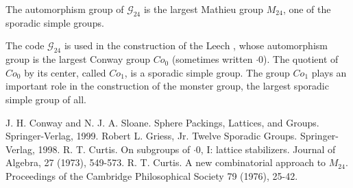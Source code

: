 \documentclass[12pt]{article}
\newcommand{\gc}{\mathcal{G}_{24}}
\begin{document}
The automorphism group of $\gc$ is the largest Mathieu group $M_{24}$, one of the sporadic simple groups.  

The code $\gc$ is used in the construction of the Leech , whose automorphism group is the largest Conway group $Co_0$ (sometimes written $\cdot 0$).  The quotient of $Co_0$ by its center, called $Co_1$, is a sporadic simple group.  The group $Co_1$ plays an important role in the construction of the monster group, the largest sporadic simple group of all.

\begin{thebibliography}{9}
 J. H. Conway and N. J. A. Sloane. Sphere Packings, Lattices, and Groups.  Springer-Verlag, 1999.
 Robert L. Griess, Jr.  Twelve Sporadic Groups.  Springer-Verlag, 1998.
 R. T. Curtis.  On subgroups of $\cdot 0$, I: lattice stabilizers.  Journal of Algebra, 27 (1973), 549-573.
 R. T. Curtis.  A new combinatorial approach to $M_{24}$. Proceedings of the Cambridge Philosophical Society 79 (1976), 25-42.
\end{thebibliography}
\end{document}
